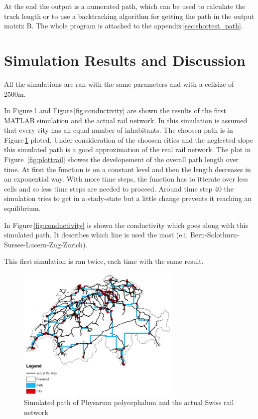 \documentclass[11pt]{scrartcl}
\begin{document}
\null

At the end the output is a numerated path, which can be used to calculate the track length or to use a backtracking algorithm for getting the path in the output matrix B. The whole program is attached to the appendix\,\ref{sec:shortest_path}.



\section{Simulation Results and Discussion}
\label{sec:results}
All the simulations are ran with the same parameters and with a cellsize of 2500m.

In Figure\,\ref{fig:path} and Figure\,\ref{fig:conductivity} are shown the results of the first MATLAB simulation and the actual rail network. In this simulation is assumed that every city has an equal number of inhabitants. The choosen path is in Figure\,\ref{fig:path} ploted. Under consideration of the choosen cities and the neglected slope this simulated path is a good approximation of the real rail network. The plot in Figure \,\ref{fig:plottrail} showes the developement of the overall path length over time. At first the function is on a constant level and then the length decreases in an exponential way. With more time steps,  the function has to itterate over less cells and so less time steps are needed to proceed. Around time step 40 the simulation tries to get in a stady-state but a little change prevents it reaching an equilibrium.

In Figure\,\ref{fig:conductivity} is shown the conductivity which goes along with this simulated path. It describes which line is used the most (e.i. Bern-Solothurn-Sursee-Lucern-Zug-Zurich).

This first simulation is ran twice, each time with the same result.



\begin{figure}[H]
	\centering
	\includegraphics[width=0.7\textwidth]{figures/path_railway}
	\caption{Simulated path of Physarum polycephalum and the actual Swiss rail network}
	\label{fig:path}
\end{figure}
\end{document}
